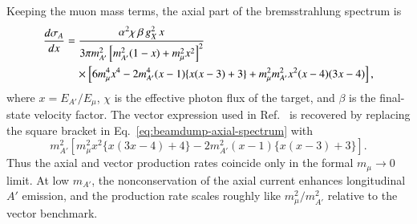 \documentclass[onecolumn, aps, nofootinbib, prd, preprint, floats, floatfix, amsmath, amssymb, superscriptaddress, preprintnumbers]{revtex4-1}
\begin{document}
Keeping the muon mass terms, the axial part of the bremsstrahlung spectrum is
\begin{align}
\frac{d\sigma_A}{dx}
&=
\frac{\alpha^2\chi\,\beta\,g_X^2\,x}
{3\pi m_{A'}^2\left[m_{A'}^2(1-x)+m_\mu^2x^2\right]^2}
\notag\\
&\quad\times
\left[
6m_\mu^4x^4
-2m_{A'}^4(x-1)\{x(x-3)+3\}
+m_\mu^2m_{A'}^2x^2(x-4)(3x-4)
\right],
\label{eq:beamdump-axial-spectrum}
\end{align}
where \(x=E_{A'}/E_\mu\), \(\chi\) is the effective photon flux of the target, and \(\beta\) is the final-state velocity factor. The vector expression used in Ref.~\cite{Chakraborty:2025jbd} is recovered by replacing the square bracket in Eq.~\eqref{eq:beamdump-axial-spectrum} with
\begin{equation}
m_{A'}^2\left[
m_\mu^2x^2\{x(3x-4)+4\}
-2m_{A'}^2(x-1)\{x(x-3)+3\}
\right].
\label{eq:beamdump-vector-bracket}
\end{equation}
Thus the axial and vector production rates coincide only in the formal \(m_\mu\to0\) limit. At low \(m_{A'}\), the nonconservation of the axial current enhances longitudinal \(A'\) emission, and the production rate scales roughly like \(m_\mu^2/m_{A'}^2\) relative to the vector benchmark.
\end{document}
